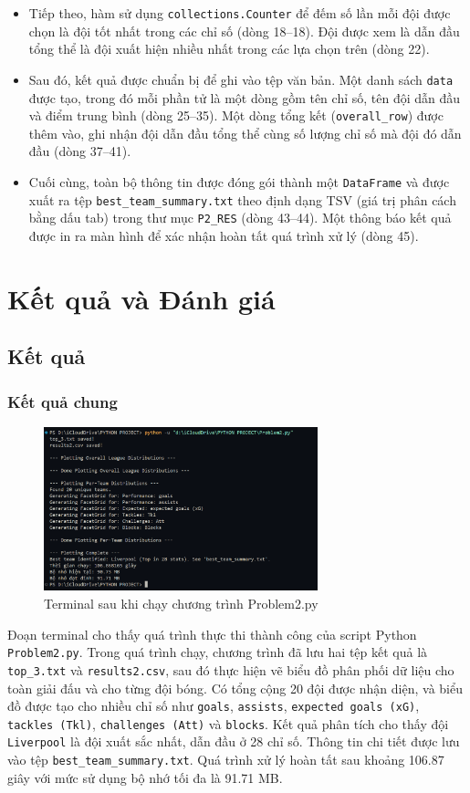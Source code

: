 \documentclass[12pt]{report}
\begin{document}
{\begin{itemize}
    \item Tiếp theo, hàm sử dụng \texttt{collections.Counter} để đếm số lần mỗi đội được chọn là đội tốt nhất trong các chỉ số (dòng 18--18). Đội được xem là dẫn đầu tổng thể là đội xuất hiện nhiều nhất trong các lựa chọn trên (dòng 22).

    \item Sau đó, kết quả được chuẩn bị để ghi vào tệp văn bản. Một danh sách \texttt{data} được tạo, trong đó mỗi phần tử là một dòng gồm tên chỉ số, tên đội dẫn đầu và điểm trung bình (dòng 25--35). Một dòng tổng kết (\texttt{overall\_row}) được thêm vào, ghi nhận đội dẫn đầu tổng thể cùng số lượng chỉ số mà đội đó dẫn đầu (dòng 37--41).

    \item Cuối cùng, toàn bộ thông tin được đóng gói thành một \texttt{DataFrame} và được xuất ra tệp \texttt{best\_team\_summary.txt} theo định dạng TSV (giá trị phân cách bằng dấu tab) trong thư mục \texttt{P2\_RES} (dòng 43--44). Một thông báo kết quả được in ra màn hình để xác nhận hoàn tất quá trình xử lý (dòng 45).
\end{itemize}
\section{Kết quả và Đánh giá}
\subsection{Kết quả}
\subsubsection{Kết quả chung}
\begin{figure}[h]
    \centering
    \includegraphics[width=300px]{Terminal_2.png}
    \caption{Terminal sau khi chạy chương trình Problem2.py}
    \label{fig:terminal2}
\end{figure}
Đoạn terminal cho thấy quá trình thực thi thành công của script Python \texttt{Problem2.py}. Trong quá trình chạy, chương trình đã lưu hai tệp kết quả là \texttt{top\_3.txt} và \texttt{results2.csv}, sau đó thực hiện vẽ biểu đồ phân phối dữ liệu cho toàn giải đấu và cho từng đội bóng. Có tổng cộng 20 đội được nhận diện, và biểu đồ được tạo cho nhiều chỉ số như \texttt{goals}, \texttt{assists}, \texttt{expected goals (xG)}, \texttt{tackles (Tkl)}, \texttt{challenges (Att)} và \texttt{blocks}. Kết quả phân tích cho thấy đội \texttt{Liverpool} là đội xuất sắc nhất, dẫn đầu ở 28 chỉ số. Thông tin chi tiết được lưu vào tệp \texttt{best\_team\_summary.txt}. Quá trình xử lý hoàn tất sau khoảng 106.87 giây với mức sử dụng bộ nhớ tối đa là 91.71 MB.\\

}
\end{document}
